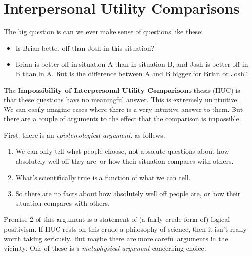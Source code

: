 
\def\mytitle{Sen on Social Welfare}
\def\myauthor{Brian Weatherson}
\def\mydate{March 15, 2018}


\section{Interpersonal Utility Comparisons}
\label{interpersonalutilitycomparisons}

The big question is can we ever make sense of questions like these:

\begin{itemize}
\item{} Is Brian better off than Josh in this situation?

\item{} Brian is better off in situation A than in situation B, and Josh is better off in B than in A. But is the difference between A and B bigger for Brian or Josh?

\end{itemize}
The \textbf{Impossibility of Interpersonal Utility Comparisons} thesis (IIUC) is that these questions have no meaningful answer. This is extremely unintuitive. We can easily imagine cases where there is a very intuitive answer to them. But there are a couple of arguments to the effect that the comparison is impossible.

First, there is an \emph{epistemological argument}, as follows.

\begin{enumerate}
\item{} We can only tell what people choose, not absolute questions about how absolutely well off they are, or how their situation compares with others.

\item{} What's scientifically true is a function of what we can tell.

\item{} So there are no facts about how absolutely well off people are, or how their situation compares with others.

\end{enumerate}
Premise 2 of this argument is a statement of (a fairly crude form of) logical positivism. If IIUC rests on this crude a philosophy of science, then it isn't really worth taking seriously. But maybe there are more careful arguments in the vicinity. One of these is a \emph{metaphysical argument} concerning choice.

